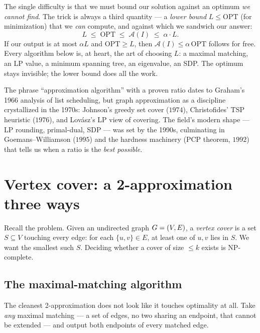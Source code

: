 \begin{intuitionbox}
The single difficulty is that we must bound our solution against an optimum \emph{we cannot find}. The
trick is always a third quantity --- a \emph{lower bound} $L \le \mathrm{OPT}$ (for minimization) that we
\emph{can} compute, and against which we sandwich our answer:
\[
  L \;\le\; \mathrm{OPT} \;\le\; \mathcal{A}(I) \;\le\; \alpha\cdot L.
\]
If our output is at most $\alpha L$ and $\mathrm{OPT} \ge L$, then $\mathcal{A}(I)\le \alpha\,\mathrm{OPT}$
follows for free. Every algorithm below is, at heart, the art of choosing $L$: a maximal matching, an
LP value, a minimum spanning tree, an eigenvalue, an SDP. The optimum stays invisible; the lower
bound does all the work.
\end{intuitionbox}

\begin{historybox}
The phrase ``approximation algorithm'' with a proven ratio dates to Graham's 1966 analysis of list
scheduling, but graph approximation as a discipline crystallized in the 1970s: Johnson's greedy set
cover ($1974$), Christofides' TSP heuristic ($1976$), and Lov\'asz's LP view of covering. The field's
modern shape --- LP rounding, primal-dual, SDP --- was set by the 1990s, culminating in
Goemans--Williamson ($1995$) and the hardness machinery (PCP theorem, $1992$) that tells us when a
ratio is the \emph{best possible}.
\end{historybox}

\section{Vertex cover: a 2-approximation three ways}

Recall the problem. Given an undirected graph $G=(V,E)$, a \emph{vertex cover} is a set
$S\subseteq V$ touching every edge: for each $\{u,v\}\in E$, at least one of $u,v$ lies in $S$. We
want the smallest such $S$. Deciding whether a cover of size $\le k$ exists is \textsf{NP}-complete.

\subsection{The maximal-matching algorithm}

The cleanest 2-approximation does not look like it touches optimality at all. Take \emph{any} maximal
matching --- a set of edges, no two sharing an endpoint, that cannot be extended --- and output both
endpoints of every matched edge.

